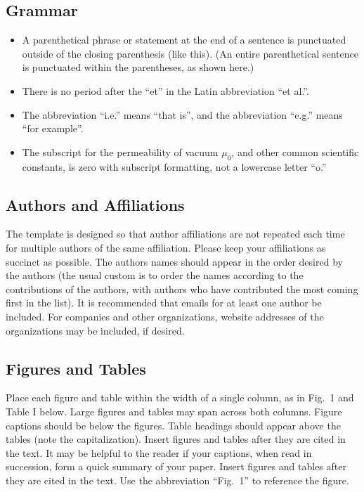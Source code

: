\documentclass[]{NRSMRev}
\begin{document}
\subsection{Grammar}

\begin{itemize}
  \item A parenthetical phrase or statement at the end of a sentence is punctuated outside of the closing parenthesis (like this). (An entire  parenthetical sentence is punctuated within the parentheses, as shown here.)
  \item There is no period after the ``et'' in the Latin abbreviation ``et al.''.
  \item The abbreviation ``i.e.'' means ``that is'', and the abbreviation ``e.g.'' means ``for example''.
  \item The subscript for the permeability of vacuum $\mu_0$, and other common scientific constants, is zero with subscript formatting, not a lowercase letter ``o.''
  
\end{itemize}

\subsection{Authors and Affiliations}

The template is designed so that author affiliations are not repeated each time for multiple authors of the same affiliation. Please keep your affiliations as succinct as possible. The authors names should appear in the order desired by the authors (the usual custom is to order the names according to the contributions of the authors, with authors who have contributed the most coming first in the list). It is recommended that emails for at least one author be included. For companies and other organizations, website addresses of the organizations  may be included, if desired.

\subsection{Figures and Tables}
Place each figure and table within the width of a single column, as in Fig.\ 1 and Table I below. Large figures and tables may span across both columns. Figure captions should be below the figures. Table headings should appear above the tables (note the capitalization). Insert figures and tables after they are cited in the text. It may be helpful to the reader if your captions, when read in succession, form a quick summary of your paper. Insert figures and tables after they are cited in the text. Use the abbreviation ``Fig.\ 1'' to reference the figure.
\end{document}

